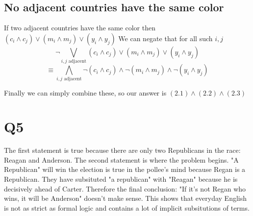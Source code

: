 \documentclass[12pt]{article}
\begin{document}
\subsection{No adjacent countries have the same color}
If two adjacent countries have the same color then $(c_i \land c_j) \lor (m_i \land m_j) \lor (y_i \land y_j)$
We can negate that for all such $i,j$
\[\neg\bigvee_{i,j \text{ adjacent}}(c_i \land c_j) \lor (m_i \land m_j) \lor (y_i \land y_j)\]
\[\equiv \bigwedge_{i,j \text{ adjacent}}\neg(c_i \land c_j) \land \neg(m_i \land m_j) \land \neg (y_i \land y_j)\]

Finally we can simply combine these, so our answer is $(2.1)\land(2.2)\land(2.3)$

\section{Q5}
The first statement is true because there are only two Republicans in the race:
Reagan and Anderson. The second statement is where the problem begins. "A Republican"
will win the election is true in the pollee's mind because Regan is a Republican.
They have subsituted "a republican" with "Reagan" because he is decisively
ahead of Carter. Therefore the final conclusion: "If it's not Regan who wins, it will
be Anderson" doesn't make sense.
\newline
This shows that everyday English is not as strict as formal logic and contains a lot
of implicit subsitutions of terms.
\end{document}
